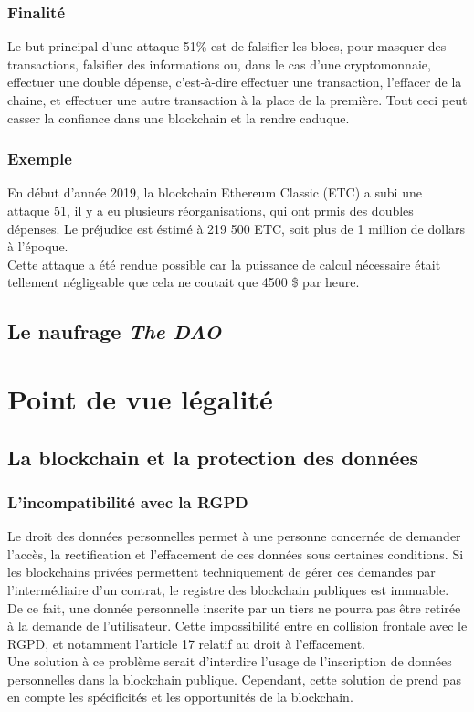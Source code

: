 \documentclass[12pt, a4paper, oneside]{book}
\begin{document}
    \subsection{Finalité}
    Le but principal d'une attaque 51\% est de falsifier les blocs, pour masquer des transactions, falsifier des informations ou, dans le cas d'une cryptomonnaie, effectuer une double dépense, c'est-à-dire effectuer une transaction, l'effacer de la chaine, et effectuer une autre transaction à la place de la première.
    \newline
    Tout ceci peut casser la confiance dans une blockchain et la rendre caduque.
    \subsection{Exemple}
    En début d'année 2019, la blockchain Ethereum Classic (ETC) a subi une attaque 51, il y a eu plusieurs réorganisations, qui ont prmis des doubles dépenses. Le préjudice est éstimé à 219 500 ETC, soit plus de 1 million de dollars à l'époque.
    \\
    Cette attaque a été rendue possible car la puissance de calcul nécessaire était tellement négligeable que cela ne coutait que 4500 \$ par heure.\cite{51ETC}

    \section{Le naufrage \emph{The DAO}}

    

    \chapter{Point de vue légalité}
    \section{La blockchain et la protection des données}
    \subsection{L'incompatibilité avec la RGPD}
    Le droit des données personnelles permet 
    à une personne concernée de demander l’accès, la rectification 
    et l’effacement de ces données sous certaines conditions. 
    Si les blockchains privées permettent techniquement de gérer
    ces demandes par l’intermédiaire d’un contrat,
    le registre des blockchain publiques est immuable. De ce fait,
    une donnée personnelle inscrite par un tiers ne pourra pas être retirée 
    à la demande de l’utilisateur. Cette impossibilité entre en collision frontale avec le RGPD, 
    et notamment l’article 17 relatif au droit à l’effacement. 
    \\ 
    \newline
    Une solution à ce problème serait d'interdire l'usage de l'inscription de données personnelles dans la blockchain publique. 
    Cependant, cette solution de prend pas en compte les spécificités et les opportunités de la blockchain.
    \cite{reg}
\end{document}
